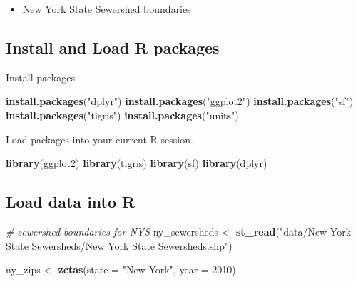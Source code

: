 \documentclass[
]{book}
\newenvironment{Shaded}{\begin{snugshade}}{\end{snugshade}}
\newcommand{\AttributeTok}[1]{\textcolor[rgb]{0.13,0.29,0.53}{#1}}
\newcommand{\CommentTok}[1]{\textcolor[rgb]{0.56,0.35,0.01}{\textit{#1}}}
\newcommand{\DecValTok}[1]{\textcolor[rgb]{0.00,0.00,0.81}{#1}}
\newcommand{\FunctionTok}[1]{\textcolor[rgb]{0.13,0.29,0.53}{\textbf{#1}}}
\newcommand{\NormalTok}[1]{#1}
\newcommand{\OtherTok}[1]{\textcolor[rgb]{0.56,0.35,0.01}{#1}}
\newcommand{\StringTok}[1]{\textcolor[rgb]{0.31,0.60,0.02}{#1}}
\providecommand{\tightlist}{%
  \setlength{\itemsep}{0pt}\setlength{\parskip}{0pt}}
\begin{document}
\begin{itemize}
\tightlist
\item
  New York State Sewershed boundaries
\end{itemize}

\subsection{Install and Load R packages}\label{install-and-load-r-packages-1}

Install packages

\begin{Shaded}
\begin{Highlighting}[]
\FunctionTok{install.packages}\NormalTok{(}\StringTok{"dplyr"}\NormalTok{)}
\FunctionTok{install.packages}\NormalTok{(}\StringTok{"ggplot2"}\NormalTok{)}
\FunctionTok{install.packages}\NormalTok{(}\StringTok{"sf"}\NormalTok{)}
\FunctionTok{install.packages}\NormalTok{(}\StringTok{"tigris"}\NormalTok{)}
\FunctionTok{install.packages}\NormalTok{(}\StringTok{"units"}\NormalTok{)}
\end{Highlighting}
\end{Shaded}

Load packages into your current R session.

\begin{Shaded}
\begin{Highlighting}[]
\FunctionTok{library}\NormalTok{(ggplot2)}
\FunctionTok{library}\NormalTok{(tigris)}
\FunctionTok{library}\NormalTok{(sf)}
\FunctionTok{library}\NormalTok{(dplyr)}
\end{Highlighting}
\end{Shaded}

\subsection{Load data into R}\label{load-data-into-r}

\begin{Shaded}
\begin{Highlighting}[]
\CommentTok{\# sewershed boundaries for NYS}
\NormalTok{ny\_sewersheds }\OtherTok{\textless{}{-}} \FunctionTok{st\_read}\NormalTok{(}\StringTok{"data/New York State Sewersheds/New York State Sewersheds.shp"}\NormalTok{)}

\NormalTok{ny\_zips }\OtherTok{\textless{}{-}} \FunctionTok{zctas}\NormalTok{(}\AttributeTok{state =} \StringTok{"New York"}\NormalTok{, }\AttributeTok{year =} \DecValTok{2010}\NormalTok{)}
\end{Highlighting}
\end{Shaded}
\end{document}
